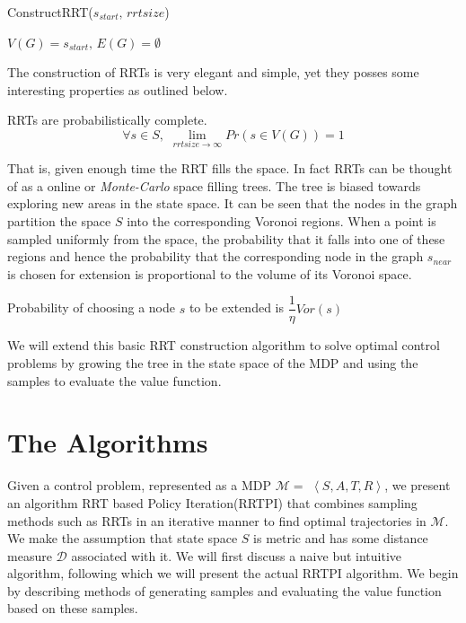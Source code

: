 \documentclass[wcp]{jmlr}
\begin{document}
\begin{algorithm2e}
\caption{ConstructRRT($s_{start},\,rrtsize$)}
\label{alg:basicrrt}
\dontprintsemicolon
$V(G)=s_{start},\,E(G)=\emptyset$\;
\end{algorithm2e}
The construction of RRTs is very elegant and simple, yet they posses some interesting properties\citep{rrt} as outlined below.
\begin{theorem}
RRTs are probabilistically complete. \[ \forall{s\in S},\,\, \lim_{\textit{rrtsize} \rightarrow \infty } Pr(s \in V(G)) = 1 \]
\end{theorem}
That is, given enough time the RRT fills the space. In fact RRTs can be thought of as a online or \emph{Monte-Carlo} space filling trees. The tree is biased towards exploring new areas in the state space. It can be seen that the nodes in the graph partition the space $S$ into the corresponding Voronoi regions. When a point is sampled uniformly from the space, the probability that it falls into one of these regions and hence the probability that the corresponding node in the graph $s_{near}$ is chosen for extension is proportional to the volume of its Voronoi space.
\begin{theorem}
Probability of choosing a node $s$ to be extended is $ \dfrac{1}{\eta} \textit{Vor}(s)$
\end{theorem}
We will extend this basic RRT construction algorithm to solve optimal control problems by growing the tree in the state space of the MDP and using the samples to evaluate the value function.

\section{The Algorithms}
Given a control problem, represented as a MDP $ \mathcal{M}=$ $\left\langle S,A,T,R\right\rangle$, we present an algorithm RRT based Policy Iteration(RRTPI) that combines sampling methods such as RRTs in an iterative manner to find optimal trajectories in $\mathcal{M}$. We make the assumption that state space $S$ is metric and has some distance measure $ \mathcal{D} $ associated with it. We will first discuss a naive but intuitive algorithm, following which we will present the actual RRTPI algorithm. We begin by describing methods of generating samples and evaluating the value function based on these samples.
\end{document}
